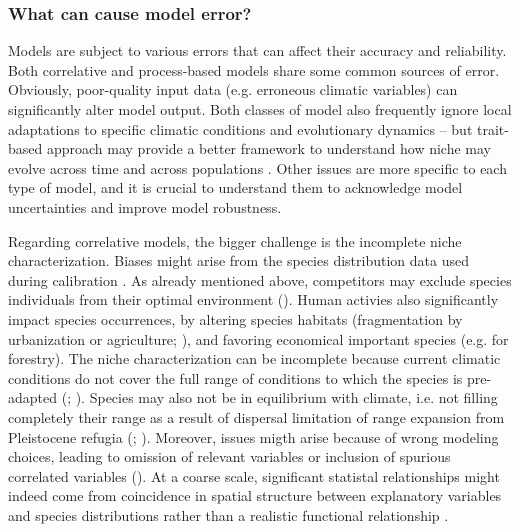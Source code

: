 \subsubsection{What can cause model error?} \label{sec:error}

Models are subject to various errors that can affect their accuracy and reliability. Both correlative and process-based models share some common sources of error. Obviously, poor-quality input data (e.g. erroneous climatic variables) can significantly alter model output. Both classes of model also frequently ignore local adaptations to specific climatic conditions and evolutionary dynamics -- but trait-based approach may provide a better framework to understand how niche may evolve across time and across populations \citep{Holt2009}. Other issues are more specific to each type of model, and it is crucial to understand them to acknowledge model uncertainties and improve model robustness.

Regarding correlative models, the bigger challenge is the incomplete niche characterization. Biases might arise from the species distribution data used during calibration \citep{BarbetMassin2010, Duputie2014, Aubry2017}. As already mentioned above, competitors may exclude species individuals from their optimal environment (). Human activies also significantly impact species occurrences, by altering species habitats (fragmentation by urbanization or agriculture; ), and favoring economical important species (e.g. for forestry). The niche characterization can be incomplete because current climatic conditions do not cover the full range of conditions to which the species is pre-adapted (\citealp{Chevalier2024}; ). Species may also not be in equilibrium with climate, i.e. not filling completely their range as a result of dispersal limitation of range expansion from Pleistocene refugia (\citealp{Svenning2004}; ). Moreover, issues migth arise because of wrong modeling choices, leading to omission of relevant variables or inclusion of spurious correlated variables (). At a coarse scale, significant statistal relationships might indeed come from coincidence in spatial structure between explanatory variables and species distributions rather than a realistic functional relationship \citep{Bahn2007, Journe2020, Fourcade2018}.

